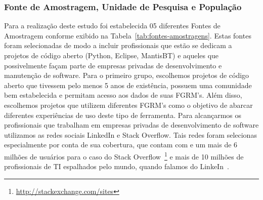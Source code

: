 \subsubsection{Fonte de Amostragem, Unidade de Pesquisa e População}

Para a realização deste estudo foi estabelecida 05 diferentes Fontes de
Amostragem conforme exibido na Tabela~\ref{tab:fontes-amostragens}. Estas fontes
foram selecionadas de modo a incluir profissionais que estão se dedicam a
projetos de código aberto (Python, Eclipse, MantisBT) e aqueles que
possivelmente façam parte de empresas privadas de desenvolvimento e manutenção
de software. Para o primeiro grupo, escolhemos projetos de código aberto que
tivessem pelo menos 5 anos de existência, possuem uma comunidade bem
estabelecida e permitam acesso aos dados de suas FGRM's. Além disso, escolhemos
projetos que utilizem diferentes FGRM's como o objetivo de abarcar diferentes
experiências de uso deste tipo de ferramenta. Para alcançarmos os profissionais
que trabalham em empresas privadas de desenvolvimento de software utilizamos  as
redes sociais LinkedIn e Stack Overflow. Tais redes foram selecionas
especialmente por conta de sua cobertura, que contam com e um mais de 6 milhões
de usuários para o caso do Stack
Overflow~\footnote{\url{http://stackexchange.com/sites}} e mais de 10 milhões de
profissionais de TI espalhados pelo mundo, quando falamos do
LinkeIn~\cite{de2014towards}.

\begin{table}[htb]
\centering
{}
\caption{Fontes de Amostragem utilizadas no estudo.}
\label{tb:fonte-de-amostragens}
\end{table}

